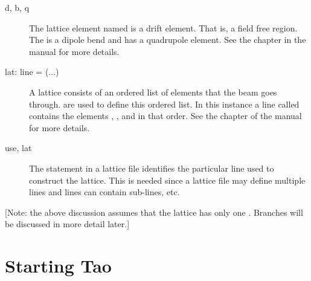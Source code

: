\documentclass{hitec}
\newcommand{\Section}[1]{\section{#1}\vspace*{-1ex}}
\begin{document}
\begin{description}
  \item[d, b, q] \Newline
The lattice element named  is a drift element. That is, a field free region. The  is a
dipole bend and  has a quadrupole element. See the  chapter in the \bmad manual
for more details.
  \item[lat: line = (...)] \Newline
A lattice consists of an ordered list of elements that the beam goes through.  are used
to define this ordered list. In this instance a line called  contains the elements
, , and  in that order. 
See the  chapter of the \bmad manual for more details.
  \item[use, lat] \Newline
The  statement in a lattice file identifies the particular line used to construct the
lattice. This is needed since a lattice file may define multiple lines and lines can contain
sub-lines, etc.
  \end{description}

[Note: the above discussion assumes that the lattice has only one . Branches will be
discussed in more detail later.]

\Section{Starting Tao}
\label{s:tao.start}
\end{document}
